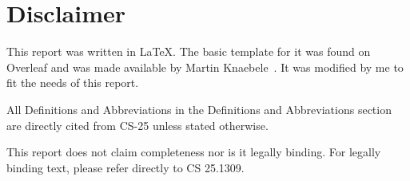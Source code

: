 \chapter*{Disclaimer}
%



\noindent This report was written in \LaTeX. The basic template for it was found on Overleaf and was made available by Martin Knaebele~\cite{template}. It was modified by me to fit the needs of this report.

\noindent All Definitions and Abbreviations in the Definitions and Abbreviations section are directly cited from CS-25 unless stated otherwise.

\noindent This report does not claim completeness nor is it legally binding. For legally binding text, please refer directly to CS 25.1309.

